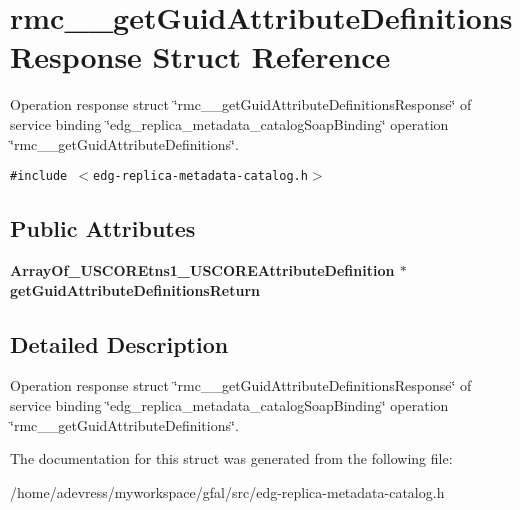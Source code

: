 \section{rmc\_\-\_\-get\-Guid\-Attribute\-Definitions\-Response Struct Reference}
\label{structrmc____getGuidAttributeDefinitionsResponse}
Operation response struct \char`\"{}rmc\_\-\_\-get\-Guid\-Attribute\-Definitions\-Response\char`\"{} of service binding \char`\"{}edg\_\-replica\_\-metadata\_\-catalog\-Soap\-Binding\char`\"{} operation \char`\"{}rmc\_\-\_\-get\-Guid\-Attribute\-Definitions\char`\"{}.  


{\tt \#include $<$edg-replica-metadata-catalog.h$>$}

\subsection*{Public Attributes}
\begin{CompactItemize}
\item 
\bf{Array\-Of\_\-USCOREtns1\_\-USCOREAttribute\-Definition} $\ast$ \textbf{get\-Guid\-Attribute\-Definitions\-Return}\label{structrmc____getGuidAttributeDefinitionsResponse_f9c4555460ca273e5c3ce54848cf82a9}

\end{CompactItemize}


\subsection{Detailed Description}
Operation response struct \char`\"{}rmc\_\-\_\-get\-Guid\-Attribute\-Definitions\-Response\char`\"{} of service binding \char`\"{}edg\_\-replica\_\-metadata\_\-catalog\-Soap\-Binding\char`\"{} operation \char`\"{}rmc\_\-\_\-get\-Guid\-Attribute\-Definitions\char`\"{}. 



The documentation for this struct was generated from the following file:\begin{CompactItemize}
\item 
/home/adevress/myworkspace/gfal/src/edg-replica-metadata-catalog.h\end{CompactItemize}
